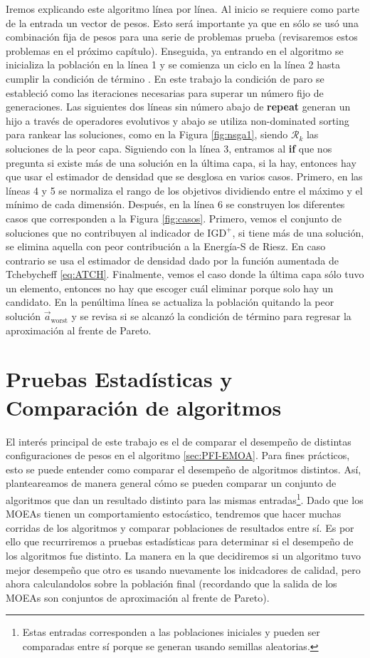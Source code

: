 Iremos explicando este algoritmo línea por línea. Al inicio se requiere como parte de la entrada un vector de pesos. Esto será importante ya que en \cite{PFI} sólo se usó una combinación fija de pesos para una serie de problemas prueba (revisaremos estos problemas en el próximo capítulo). Enseguida, ya entrando en el algoritmo se inicializa la población en la línea 1 y se comienza un ciclo en la línea 2 hasta cumplir la condición de término . En este trabajo la condición de paro se estableció como las iteraciones necesarias para superar un número fijo de generaciones. Las siguientes dos líneas sin número abajo de \textbf{repeat} generan un hijo a través de operadores evolutivos y abajo se utiliza non-dominated sorting para rankear las soluciones, como en la Figura \ref{fig:nsga1}, siendo $\mathcal{R}_k$ las soluciones de la peor capa. 
Siguiendo con la línea 3, entramos al \textbf{if} que nos pregunta si existe más de una solución en la última capa, si la hay, entonces hay que usar el estimador de densidad que se desglosa en varios casos. Primero, en las líneas 4 y 5 se normaliza el rango de los objetivos dividiendo entre el máximo y el mínimo de cada dimensión. Después, en la línea 6 se construyen los diferentes casos que corresponden a la Figura \ref{fig:casos}. Primero, vemos el conjunto de soluciones que no contribuyen al indicador de $\text{IGD}^+$, si tiene más de una solución, se elimina aquella con peor contribución a la Energía-S de Riesz. En caso contrario se usa el estimador de densidad dado por la función aumentada de Tchebycheff \eqref{eq:ATCH}. Finalmente, vemos el caso donde la última capa sólo tuvo un elemento, entonces no hay que escoger cuál eliminar porque solo hay un candidato. En la penúltima línea se actualiza la población quitando la peor solución $\vec{a}_{\text{worst}}$ y se revisa si se alcanzó la condición de término para regresar la aproximación al frente de Pareto. 

\section{Pruebas Estadísticas y Comparación de algoritmos} \label{sec:pruebas_estadisticas}

El interés principal de este trabajo es el de comparar el desempeño de distintas configuraciones de pesos en el algoritmo \ref{sec:PFI-EMOA}. Para fines prácticos, esto se puede entender como comparar el desempeño de algoritmos distintos. Así, planteareamos de manera general cómo se pueden comparar un conjunto de algoritmos que dan un resultado distinto para las mismas entradas\footnote{Estas entradas corresponden a las poblaciones iniciales y pueden ser comparadas entre sí porque se generan usando semillas aleatorias.}. Dado que los MOEAs tienen un comportamiento estocástico, tendremos que hacer muchas corridas de los algoritmos y comparar poblaciones de resultados entre sí. Es por ello que recurriremos a pruebas estadísticas para determinar si el desempeño de los algoritmos fue distinto. La manera en la que decidiremos si un algoritmo tuvo mejor desempeño que otro es usando nuevamente los inidcadores de calidad, pero ahora calculandolos sobre la población final (recordando que la salida de los MOEAs son conjuntos de aproximación al frente de Pareto).

